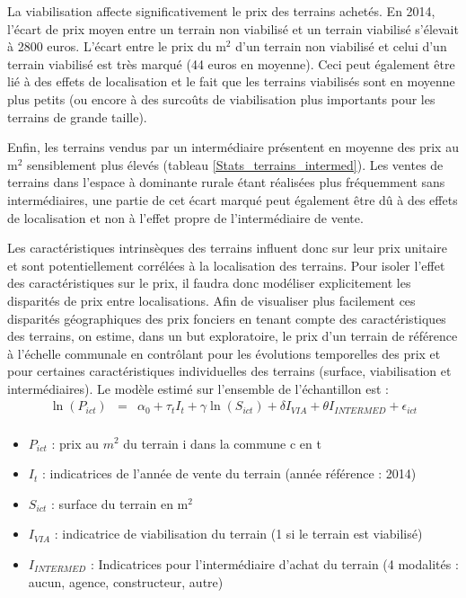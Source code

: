 \documentclass[10.5pt,a4paper]{article}
\begin{document}
{

La viabilisation affecte significativement le prix des terrains achetés. En 2014, l'écart de prix moyen entre un terrain non viabilisé et un terrain viabilisé s'élevait à 2800 euros. L'écart entre le prix du m$^2$ d'un terrain non viabilisé et celui d'un terrain viabilisé est très marqué (44 euros en moyenne).  Ceci peut également être lié à des effets de localisation et le fait que les terrains viabilisés sont en moyenne plus petits (ou encore à des surcoûts de viabilisation plus importants pour les terrains de grande taille). \par 

\newpage



Enfin, les terrains vendus par un intermédiaire présentent en moyenne des prix au m$^2$ sensiblement plus élevés (tableau \ref{Stats_terrains_intermed}). Les ventes de terrains dans l'espace à dominante rurale étant réalisées plus fréquemment sans intermédiaires, une partie de cet écart marqué peut également être dû à des effets de localisation et non à l'effet propre de l'intermédiaire de vente. \par    

Les caractéristiques intrinsèques des terrains influent donc sur leur prix unitaire et sont potentiellement corrélées à la localisation des terrains. Pour isoler l'effet des caractéristiques sur le prix, il faudra donc modéliser explicitement les disparités de prix entre localisations. Afin de visualiser plus facilement ces disparités géographiques des prix fonciers en tenant compte des caractéristiques des terrains, on estime, dans un but exploratoire, le prix d'un terrain de référence à l'échelle communale en contrôlant pour les évolutions temporelles des prix et pour certaines caractéristiques individuelles des terrains (surface, viabilisation et intermédiaires). Le modèle estimé sur l'ensemble de l'échantillon est :  
\begin{eqnarray*}
\ln(P_{ict}) & =& \alpha_0 + \tau_{t} I_t + \gamma \ln(S_{ict}) + \delta I_{VIA} + \theta I_{INTERMED} +  \epsilon_{ict} \\
\label{eq:}
\end{eqnarray*}

\begin{itemize}[font=\tiny]
	\item $P_{ict}$ : prix au $m^2$ du terrain i dans la commune c en t
	\item $I_t$ : indicatrices de l'année de vente du terrain (année référence : 2014)
	\item $S_{ict}$ : surface du terrain en m$^2$
	\item $I_{VIA}$ : indicatrice de viabilisation du terrain (1 si le terrain est viabilisé)
	\item $I_{INTERMED}$ : Indicatrices pour l'intermédiaire d'achat du terrain (4 modalités : aucun, agence, constructeur, autre)
\end{itemize}

}
\end{document}
